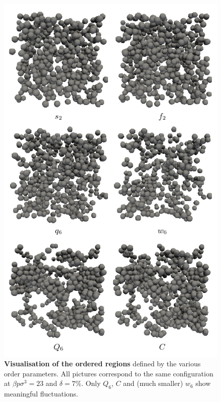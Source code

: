 \documentclass[twocolumn,superscriptaddress]{revtex4-1}
\begin{document}
\begin{figure}
	\centering
	\includegraphics{fig_3D}
	\caption{\textbf{Visualisation of the ordered regions} defined by the various order parameters. All pictures correspond to the same configuration at $\beta p\sigma^3=23$ and $\delta=7\%$. Only $Q_6$, $C$ and (much smaller) $w_6$ show meaningful fluctuations.}
	\label{fig:3D}
\end{figure}
\end{document}
